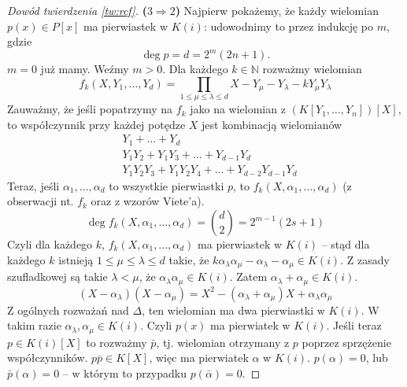 \documentclass{article}
\newcommand{\N}{\mathbb{N}}
\theoremstyle{plain}
\theoremstyle{definition}
\theoremstyle{remark}
\begin{document}
\begin{proof}[Dowód twierdzenia \ref{tw:rcf}]
	\textbf{($3 \Rightarrow 2$)}
	Najpierw pokażemy, że każdy wielomian $p(x) \in P[x]$ ma pierwiastek w
	$K(i)$: udowodnimy to przez indukcję po $m$, gdzie
	$$\deg p = d = 2^m(2n + 1).$$
	$m = 0$ już mamy. Weźmy $m > 0$.
	Dla każdego $k \in \N$ rozważmy wielomian
	\[
		f_k(X, Y_1, \ldots, Y_d) =
		\prod_{1 \leq \mu \leq \lambda \leq d}
		X - Y_\mu - Y_\lambda - k Y_\mu Y_\lambda
	\]
	Zauważmy, że jeśli popatrzymy na $f_k$ jako na wielomian z
	$(K[Y_1, \ldots, Y_n])[X]$, to współczynnik przy każdej potędze $X$
	jest kombinacją wielomianów
	\begin{align*}
		&Y_1 + \ldots + Y_d \\
		&Y_1 Y_2 + Y_1 Y_3 + \ldots + Y_{d-1} Y_d \\
		&Y_1 Y_2 Y_3 + Y_1 Y_2 Y_4 + \ldots + Y_{d-2} Y_{d-1} Y_d
	\end{align*}
	Teraz, jeśli $\alpha_1, \ldots, \alpha_d$ to wszystkie pierwiastki
	$p$, to $f_k(X, \alpha_1, \ldots, \alpha_d)$ %
	(z obserwacji nt. $f_k$ oraz z wzorów Viete'a).
	\[
		\deg f_k(X, \alpha_1, \ldots, \alpha_d) = {d \choose 2} =
		2^{m-1}(2s + 1)
	\]
	Czyli dla każdego $k$, $f_k(X, \alpha_1, \ldots, \alpha_d)$ ma
	pierwiastek w $K(i)$ -- stąd dla każdego $k$ istnieją
	$1 \leq \mu \leq \lambda \leq d$ takie, że
	$k \alpha_\lambda \alpha_\mu - \alpha_\lambda - \alpha_\mu \in K(i)$.
	Z zasady szufladkowej są takie $\lambda < \mu$, że
	$\alpha_\lambda \alpha_\mu \in K(i)$. Zatem
	$\alpha_\lambda + \alpha_\mu \in K(i)$.
	\begin{equation}
		(X - \alpha_\lambda) (X - \alpha_\mu) =
		X^2 - (\alpha_\lambda + \alpha_\mu) X + \alpha_\lambda \alpha_\mu
	\end{equation}
	Z ogólnych rozważań nad $\Delta$, ten wielomian ma dwa pierwiastki
	w $K(i)$. W takim razie $\alpha_\lambda, \alpha_\mu \in K(i)$.
	Czyli $p(x)$ ma pierwiatek w $K(i)$. Jeśli teraz $p \in K(i)[X]$ to
	rozważmy $\bar{p}$, tj. wielomian otrzymany z $p$ poprzez sprzężenie
	współczynników. $p \bar{p} \in K[X]$, więc ma pierwiatek $\alpha$
	w $K(i)$. $p(\alpha) = 0$, lub $\bar{p}(\alpha) = 0$ -- w którym to
	przypadku $p(\bar{\alpha}) = 0$.
\end{proof}
\end{document}

